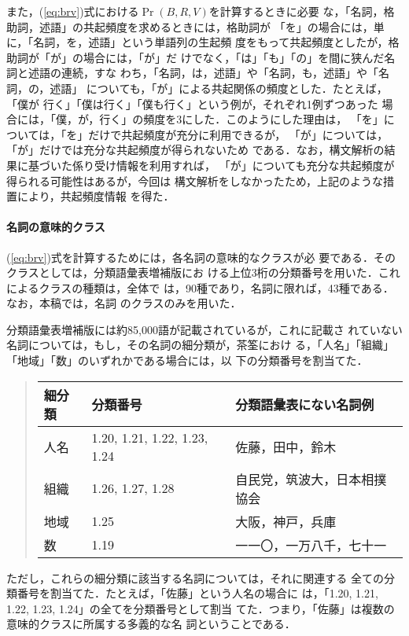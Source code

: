 また，(\ref{eq:brv})式における$\Pr(B,R,V)$を計算するときに必要
な，「名詞，格助詞，述語」の共起頻度を求めるときには，格助詞が
「を」の場合には，単に，「名詞，を，述語」という単語列の生起頻
度をもって共起頻度としたが，格助詞が「が」の場合には，「が」だ
けでなく，「は」「も」「の」を間に狭んだ名詞と述語の連続，すな
わち，「名詞，は，述語」や「名詞，も，述語」や「名詞，の，述語」
についても，「が」による共起関係の頻度とした．たとえば，「僕が
行く」「僕は行く」「僕も行く」という例が，それぞれ1例ずつあった
場合には，「僕，が，行く」の頻度を3にした．このようにした理由は，
「を」については，「を」だけで共起頻度が充分に利用できるが，
「が」については，「が」だけでは充分な共起頻度が得られないため
である．なお，構文解析の結果に基づいた係り受け情報を利用すれば，
「が」についても充分な共起頻度が得られる可能性はあるが，今回は
構文解析をしなかったため，上記のような措置により，共起頻度情報
を得た．

\paragraph{名詞の意味的クラス}

(\ref{eq:brv})式を計算するためには，各名詞の意味的なクラスが必
要である．そのクラスとしては，分類語彙表増補版\cite{bgh96}にお
ける上位3桁の分類番号を用いた．これによるクラスの種類は，全体で
は，90種であり，名詞に限れば，43種である．なお，本稿では，名詞
のクラスのみを用いた．

分類語彙表増補版には約85,000語が記載されているが，これに記載さ
れていない名詞については，もし，その名詞の細分類が，茶筌におけ
る，「人名」「組織」「地域」「数」のいずれかである場合には，以
下の分類番号を割当てた．
\begin{quote}

\vspace{1em}

\begin{tabular}{|l|l|l|}
  \hline
  細分類 & 分類番号 & 分類語彙表にない名詞例\\ \hline
  人名 & 1.20, 1.21, 1.22, 1.23, 1.24 & 佐藤，田中，鈴木\\
  組織 & 1.26, 1.27, 1.28 & 自民党，筑波大，日本相撲協会\\
  地域 & 1.25 & 大阪，神戸，兵庫\\
  数   & 1.19 & 一一〇，一万八千，七十一\\ \hline
\end{tabular}

\vspace{1em}

\end{quote}
ただし，これらの細分類に該当する名詞については，それに関連する
全ての分類番号を割当てた．たとえば，「佐藤」という人名の場合に
は，「1.20, 1.21, 1.22, 1.23, 1.24」の全てを分類番号として割当
てた．つまり，「佐藤」は複数の意味的クラスに所属する多義的な名
詞ということである．


